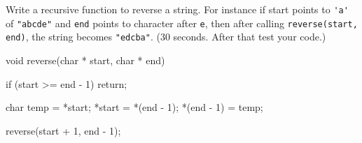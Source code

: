 \nextq
Write a recursive function to reverse a string.
For instance if start points to \verb!'a'! of \verb!"abcde"! and
\verb!end! points to character after \verb!e!, then after calling
\verb!reverse(start, end)!, the string becomes \verb!"edcba"!.
(30 seconds. After that test your code.)
\\
\ANSWER
\begin{answercode}
void reverse(char * start, char * end)
{
  if (start >= end - 1) return;
  
  char temp = *start;
  *start = *(end - 1);
  *(end - 1) = temp;
  
  reverse(start + 1, end - 1);
}
\end{answercode}


